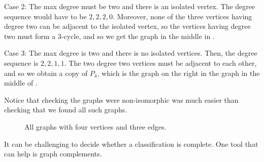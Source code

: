 \begin{exam}
\begin{apart}
\begin{soln}
                Case 2: The max degree must be two and there is an isolated vertex.  The degree sequence would have to be $2,2,2,0$.  Moreover, none of the three vertices having degree two can be adjacent to the isolated vertex, so the vertices having degree two must form a 3-cycle, and so we get the graph in the middle in .
                
                Case 3: The max degree is two and there is no isolated vertices.  Then, the degree sequence is $2, 2, 1, 1$.  The two degree two vertices must be adjacent to each other, and so we obtain a copy of $P_4$, which is the graph on the right in the graph in the middle of .
                
                Notice that checking the graphs were non-isomorphic was much easier than checking that we found all such graphs.
            \end{soln}

            \begin{figure}[hbtp]
                \centering
                
                \caption{All graphs with four vertices and three edges.}
                \label{fig_classify_order4_size3}
            \end{figure}
    \end{apart}
\end{exam}

It can be challenging to decide whether a classification is complete.  One tool that can help is graph complements. 

